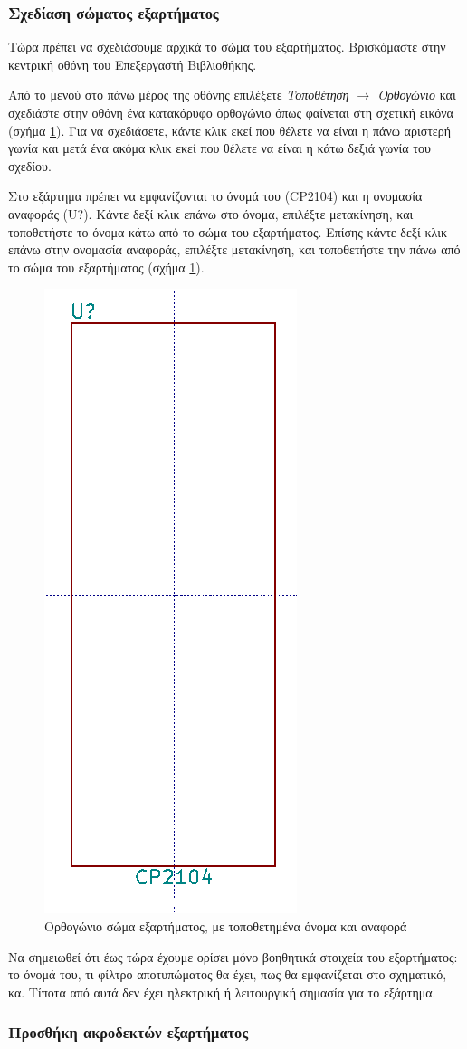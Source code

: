 \documentclass[a4paper]{article}
\begin{document}
\subsubsection{Σχεδίαση σώματος εξαρτήματος}
Τώρα πρέπει να σχεδιάσουμε αρχικά το σώμα του εξαρτήματος. Βρισκόμαστε στην κεντρική οθόνη του Επεξεργαστή Βιβλιοθήκης.

Από το μενού στο πάνω μέρος της οθόνης επιλέξετε \textit{Τοποθέτηση $\rightarrow$ Ορθογώνιο} και σχεδιάστε στην οθόνη ένα κατακόρυφο ορθογώνιο όπως φαίνεται στη σχετική εικόνα (σχήμα \ref{fig:libed-circ-body}). Για να σχεδιάσετε, κάντε κλικ εκεί που θέλετε να είναι η πάνω αριστερή γωνία και μετά ένα ακόμα κλικ εκεί που θέλετε να είναι η κάτω δεξιά γωνία του σχεδίου.

Στο εξάρτημα πρέπει να εμφανίζονται το όνομά του (CP2104) και η ονομασία αναφοράς (U?). Κάντε δεξί κλικ επάνω στο όνομα, επιλέξτε μετακίνηση, και τοποθετήστε το όνομα κάτω από το σώμα του εξαρτήματος. Επίσης κάντε δεξί κλικ επάνω στην ονομασία αναφοράς, επιλέξτε μετακίνηση, και τοποθετήστε την πάνω από το σώμα του εξαρτήματος (σχήμα \ref{fig:libed-circ-body}). 

\begin{figure}
  \begin{center}
    \includegraphics[width=.2\textwidth]{img/libed-circ-body.png}
    \caption{Ορθογώνιο σώμα εξαρτήματος, με τοποθετημένα όνομα και αναφορά}
    \label{fig:libed-circ-body}
  \end{center}
\end{figure}

Να σημειωθεί ότι έως τώρα έχουμε ορίσει μόνο βοηθητικά στοιχεία του εξαρτήματος: το όνομά του, τι φίλτρο αποτυπώματος θα έχει, πως θα εμφανίζεται στο σχηματικό, κα. Τίποτα από αυτά δεν έχει ηλεκτρική ή λειτουργική σημασία για το εξάρτημα.

\subsubsection{Προσθήκη ακροδεκτών εξαρτήματος}
\end{document}
